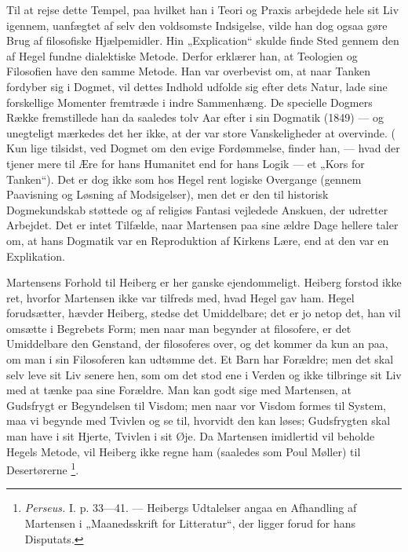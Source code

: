 \documentclass[12pt,a4paper,openany]{book}
\newcommand{\opage}[1]{\marginnote{\footnotesize\textit{[#1]}}}
\begin{document}
Til at rejse dette Tempel, paa hvilket han i Teori og Praxis arbejdede hele sit
Liv igennem, uanfægtet af selv den voldsomste Indsigelse, vilde han dog ogsaa
gøre Brug af filosofiske Hjælpemidler. Hin „Explication“ skulde finde Sted
gennem den af Hegel fundne dialektiske Metode. Derfor erklærer han, at
Teologien og Filosofien have den samme Metode. Han var overbevist om, at naar
Tanken fordyber sig i Dogmet, vil dettes Indhold udfolde sig efter dets Natur,
lade sine forskellige Momenter fremtræde i indre Sammenhæng. De specielle
Dogmers Række fremstillede han da saaledes tolv Aar efter i sin Dogmatik (1849)
--- og unegteligt mærkedes det her ikke, at der var store Vanskeligheder at
overvinde. (
\setcounter{footnote}{0}%
\opage{140}Kun lige tilsidst, ved Dogmet om den evige Fordømmelse, finder han,
--- hvad der tjener mere til Ære for hans Humanitet end for hans Logik --- et
„Kors for Tanken“). Det er dog ikke som hos Hegel rent logiske Overgange
(gennem Paavisning og Løsning af Modsigelser), men det er den til historisk
Dogmekundskab støttede og af religiøs Fantasi vejledede Anskuen, der udretter
Arbejdet. Det er intet Tilfælde, naar Martensen paa sine ældre Dage hellere
taler om, at hans Dogmatik var en Reproduktion af Kirkens Lære, end at den var
en Explikation.

Martensens Forhold til Heiberg er her ganske ejendommeligt. Heiberg forstod
ikke ret, hvorfor Martensen ikke var tilfreds med, hvad Hegel gav ham. Hegel
forudsætter, hævder Heiberg, stedse det Umiddelbare; det er jo netop det, han
vil omsætte i Begrebets Form; men naar man begynder at filosofere, er det
Umiddelbare den Genstand, der filosoferes over, og det kommer da kun an paa, om
man i sin Filosoferen kan udtømme det. Et Barn har Forældre; men det skal selv
leve sit Liv senere hen, som om det stod ene i Verden og ikke tilbringe sit Liv
med at tænke paa sine Forældre. Man kan godt sige med Martensen, at Gudsfrygt
er Begyndelsen til Visdom; men naar vor Visdom formes til System, maa vi
begynde med Tvivlen og se til, hvorvidt den kan løses; Gudsfrygten skal man
have i sit Hjerte, Tvivlen i sit Øje. Da Martensen imidlertid vil beholde
Hegels Metode, vil Heiberg ikke regne ham (saaledes som Poul Møller) til
Desertørerne%
\footnote[1]{\textit{Perseus.} I. p. 33---41. --- Heibergs Udtalelser angaa en
Afhandling af Martensen i „Maanedsskrift for Litteratur“, der ligger forud for
hans Disputats.}.
\end{document}
